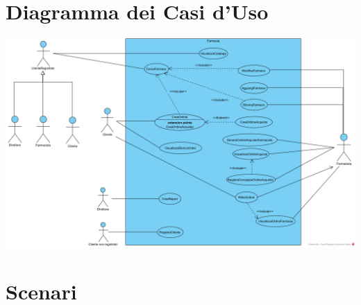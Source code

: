 \section{Diagramma dei Casi d'Uso}
\includegraphics[width=\linewidth]{chapters/usecases/UseCaseFarmacia}
\section{Scenari}
















